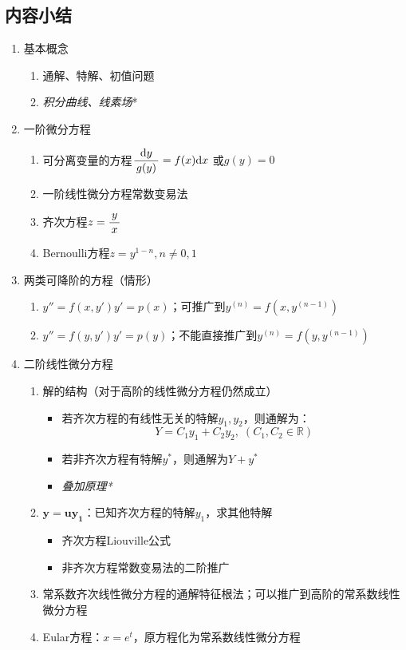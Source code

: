 \subsection{内容小结}

\begin{enumerate}[1]
  \item 基本概念
  \begin{enumerate}[(1)]
    \item 通解、特解、初值问题
    \item {\it 积分曲线、线素场}*
  \end{enumerate}
  \item 一阶微分方程
  \begin{enumerate}[(1)]
    \item 可分离变量的方程\dotfill$\displaystyle\frac{\,{\mathrm{d} y}\,}{\,{g(y)}\,}=f(x)\mathrm{d} x$
    或$g(y)=0$
    \item 一阶线性微分方程\dotfill 常数变易法
    \item 齐次方程\dotfill$z=\displaystyle\frac{\,{y}\,}{\,{x}\,}$
    \item Bernoulli方程\dotfill$z=y^{1-n},n\ne0,1$
  \end{enumerate}
  \item 两类可降阶的方程（情形）
  \begin{enumerate}[(1)]
    \item $y''=f(x,y')$\dotfill$y'=p(x)$；可推广到$y^{(n)}=f(x,y^{(n-1)})$
    \item $y''=f(y,y')$\dotfill$y'=p(y)$；不能直接推广到$y^{(n)}=f(y,y^{(n-1)})$
  \end{enumerate}
  \item 二阶线性微分方程
  \begin{enumerate}[(1)]
    \item 解的结构（对于高阶的线性微分方程仍然成立）
    \begin{itemize}
      \item 若齐次方程的有线性无关的特解$y_1,y_2$，则通解为：
      $$Y=C_1y_1+C_2y_2,\;(C_1,C_2\in\mathbb{R})$$
      \item 若非齐次方程有特解$y^*$，则通解为$Y+y^*$
      \item {\it 叠加原理*}
    \end{itemize}
    \item $\bm{y=uy_1}$：已知齐次方程的特解$y_1$，求其他特解
    \begin{itemize}
      \item 齐次方程\dotfill Liouville公式
      \item 非齐次方程\dotfill 常数变易法的二阶推广
    \end{itemize}
    \item 常系数齐次线性微分方程的通解\dotfill 特征根法；可以推广到高阶的常系数线性微分方程
    \item Eular方程：\dotfill $x=e^t$，原方程化为常系数线性微分方程
  \end{enumerate}
\end{enumerate}

